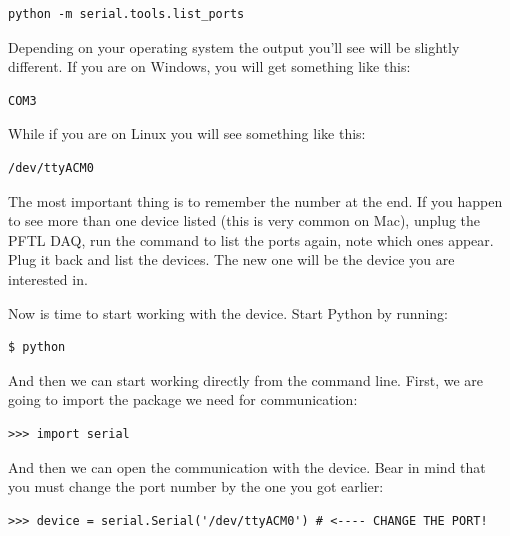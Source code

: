 \begin{verbatim}
python -m serial.tools.list_ports
\end{verbatim}


Depending on your operating system the output you'll see will be slightly different. If you are on Windows, you will get something like this:

\begin{verbatim}
COM3
\end{verbatim}

While if you are on Linux you will see something like this:

\begin{verbatim}
/dev/ttyACM0
\end{verbatim}

The most important thing is to remember the number at the end. If you happen to see more than one device listed (this is very common on Mac), unplug the {PFTL DAQ}, run the command to list the ports again, note which ones appear. Plug it back and list the devices. The new one will be the device you are interested in.

Now is time to start working with the device. Start Python by running:

\begin{verbatim}
$ python
\end{verbatim}

And then we can start working directly from the command line. First, we are going to import the package we need for communication:

\begin{verbatim}
>>> import serial
\end{verbatim}


And then we can open the communication with the device. Bear in mind that you must change the port number by the one you got earlier:

\begin{verbatim}
>>> device = serial.Serial('/dev/ttyACM0') # <---- CHANGE THE PORT!
\end{verbatim}

